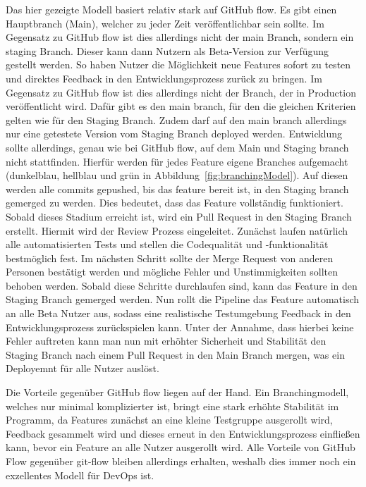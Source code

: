 Das hier gezeigte Modell basiert relativ stark auf GitHub flow.
Es gibt einen Hauptbranch (Main), welcher zu jeder Zeit veröffentlichbar sein sollte.
Im Gegensatz zu GitHub flow ist dies allerdings nicht der main Branch, sondern ein staging Branch.
Dieser kann dann Nutzern als Beta-Version zur Verfügung gestellt werden.
So haben Nutzer die Möglichkeit neue Features sofort zu testen und direktes Feedback in den Entwicklungsprozess zurück zu bringen.
Im Gegensatz zu GitHub flow ist dies allerdings nicht der Branch, der in Production veröffentlicht wird.
Dafür gibt es den main branch, für den die gleichen Kriterien gelten wie für den Staging Branch.
Zudem darf auf den main branch allerdings nur eine getestete Version vom Staging Branch deployed werden.
Entwicklung sollte allerdings, genau wie bei GitHub flow, auf dem Main und Staging branch nicht stattfinden.
Hierfür werden für jedes Feature eigene Branches aufgemacht (dunkelblau, hellblau und grün in Abbildung~\ref{fig:branchingModel}).
Auf diesen werden alle commits gepushed, bis das feature bereit ist, in den Staging branch gemerged zu werden.
Dies bedeutet, dass das Feature vollständig funktioniert.
Sobald dieses Stadium erreicht ist, wird ein Pull Request in den Staging Branch erstellt.
Hiermit wird der Review Prozess eingeleitet.
Zunächst laufen natürlich alle automatisierten Tests und stellen die Codequalität und -funktionalität bestmöglich fest.
Im nächsten Schritt sollte der Merge Request von anderen Personen bestätigt werden und mögliche Fehler und Unstimmigkeiten sollten behoben werden.
Sobald diese Schritte durchlaufen sind, kann das Feature in den Staging Branch gemerged werden.
Nun rollt die Pipeline das Feature automatisch an alle Beta Nutzer aus, sodass eine realistische Testumgebung Feedback in den Entwicklungsprozess zurückspielen kann.
Unter der Annahme, dass hierbei keine Fehler auftreten kann man nun mit erhöhter Sicherheit und Stabilität den Staging Branch nach einem Pull Request in den Main Branch mergen, was ein Deployemnt für alle Nutzer auslöst.

Die Vorteile gegenüber GitHub flow liegen auf der Hand.
Ein Branchingmodell, welches nur minimal komplizierter ist, bringt eine stark erhöhte Stabilität im Programm, da Features zunächst an eine kleine Testgruppe ausgerollt wird, Feedback gesammelt wird und dieses erneut in den Entwicklungsprozess einfließen kann, bevor ein Feature an alle Nutzer ausgerollt wird.
Alle Vorteile von GitHub Flow gegenüber git-flow bleiben allerdings erhalten, weshalb dies immer noch ein exzellentes Modell für DevOps ist.

